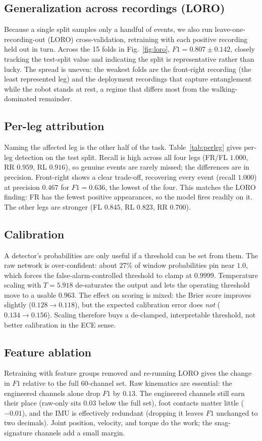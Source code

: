 \documentclass[conference]{IEEEtran}
\begin{document}
\subsection{Generalization across recordings (LORO)}
Because a single split samples only a handful of events, we also run leave-one-recording-out (LORO) cross-validation, retraining with each positive recording held out in turn. Across the 15 folds in Fig.~\ref{fig:loro}, $F1 = 0.807 \pm 0.142$, closely tracking the test-split value and indicating the split is representative rather than lucky. The spread is uneven: the weakest folds are the front-right recording (the least represented leg) and the deployment recordings that capture entanglement while the robot stands at rest, a regime that differs most from the walking-dominated remainder.

\subsection{Per-leg attribution}
Naming the affected leg is the other half of the task. Table~\ref{tab:perleg} gives per-leg detection on the test split. Recall is high across all four legs (FR/FL $1.000$, RR $0.959$, RL $0.916$), so genuine events are rarely missed; the differences are in precision. Front-right shows a clear trade-off, recovering every event (recall $1.000$) at precision $0.467$ for $F1 = 0.636$, the lowest of the four. This matches the LORO finding: FR has the fewest positive appearances, so the model fires readily on it. The other legs are stronger (FL $0.845$, RL $0.823$, RR $0.700$).

\subsection{Calibration}
A detector's probabilities are only useful if a threshold can be set from them. The raw network is over-confident: about $27\%$ of window probabilities pin near $1.0$, which forces the false-alarm-controlled threshold to clamp at $0.9999$. Temperature scaling with $T = 5.918$ de-saturates the output and lets the operating threshold move to a usable $0.963$. The effect on scoring is mixed: the Brier score improves slightly ($0.128 \to 0.118$), but the expected calibration error does \emph{not} ($0.134 \to 0.156$). Scaling therefore buys a de-clamped, interpretable threshold, not better calibration in the ECE sense.

\subsection{Feature ablation}
Retraining with feature groups removed and re-running LORO gives the change in $F1$ relative to the full 60-channel set. Raw kinematics are essential: the engineered channels alone drop $F1$ by $0.13$. The engineered channels still earn their place (raw-only sits $0.03$ below the full set), foot contacts matter little ($-0.01$), and the IMU is effectively redundant (dropping it leaves $F1$ unchanged to two decimals). Joint position, velocity, and torque do the work; the snag-signature channels add a small margin.
\end{document}
